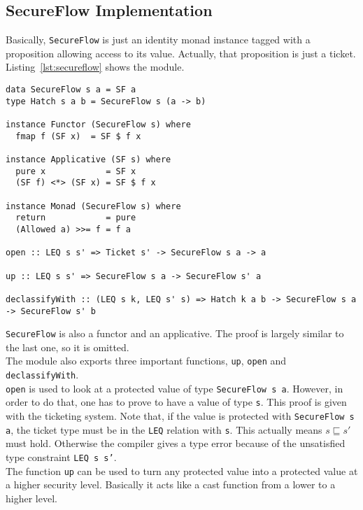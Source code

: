 \subsection{SecureFlow Implementation}
Basically, \texttt{SecureFlow} is just an identity monad instance tagged with a proposition allowing access to its value. Actually, that proposition is just a ticket. Listing~\ref{lst:secureflow} shows the module.
\begin{lstlisting}[caption={SecureFlow monad}, label={lst:secureflow}, breaklines=true]
data SecureFlow s a = SF a
type Hatch s a b = SecureFlow s (a -> b)

instance Functor (SecureFlow s) where
  fmap f (SF x)  = SF $ f x

instance Applicative (SF s) where
  pure x            = SF x
  (SF f) <*> (SF x) = SF $ f x

instance Monad (SecureFlow s) where
  return            = pure
  (Allowed a) >>= f = f a
  
open :: LEQ s s' => Ticket s' -> SecureFlow s a -> a

up :: LEQ s s' => SecureFlow s a -> SecureFlow s' a

declassifyWith :: (LEQ s k, LEQ s' s) => Hatch k a b -> SecureFlow s a -> SecureFlow s' b
\end{lstlisting}
%
%

\texttt{SecureFlow} is also a functor and an applicative. The proof is largely similar to the last one, so it is omitted. \\
The module also exports three important functions, \texttt{up}, \texttt{open} and \texttt{declassifyWith}. \\
\texttt{open} is used to look at a protected value of type \texttt{SecureFlow s a}. However, in order to do that, one has to prove to have a value of type \texttt{s}. This proof is given with the ticketing system. Note that, if the value is protected with \texttt{SecureFlow s a}, the ticket type must be in the \texttt{LEQ} relation with \texttt{s}. This actually means $s \sqsubseteq s'$ must hold. Otherwise the compiler gives a type error because of the unsatisfied type constraint \texttt{LEQ s s'}. \\
The function \texttt{up} can be used to turn any protected value into a protected value at a higher security level. Basically it acts like a cast function from a lower to a higher level. 
